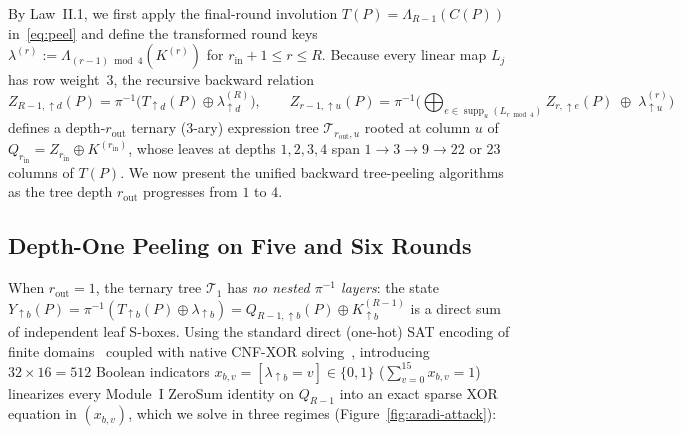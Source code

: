 \documentclass[11pt,a4paper]{article}
\theoremstyle{definition}
\theoremstyle{remark}
\newcommand{\supp}{\operatorname{supp}}
\begin{document}
By Law~II.1, we first apply the final-round involution $T(P) = \Lambda_{R-1}(C(P))$ in~\eqref{eq:peel} and define the transformed round keys $\lambda^{(r)} := \Lambda_{(r-1)\bmod 4}(K^{(r)})$ for $r_{\text{in}} + 1 \le r \le R$. Because every linear map $L_j$ has row weight~$3$, the recursive backward relation
\[
Z_{R-1,\uparrow d}(P) = \pi^{-1}\!\bigl(T_{\uparrow d}(P) \oplus \lambda^{(R)}_{\uparrow d}\bigr), \qquad
Z_{r-1,\uparrow u}(P) = \pi^{-1}\!\Biggl(\bigoplus_{e \in \supp_u(L_{r\bmod 4})} Z_{r,\uparrow e}(P) \;\oplus\; \lambda^{(r)}_{\uparrow u}\Biggr)
\]
defines a depth-$r_{\text{out}}$ ternary ($3$-ary) expression tree $\mathcal{T}_{r_{\text{out}}, u}$ rooted at column $u$ of $Q_{r_{\text{in}}} = Z_{r_{\text{in}}} \oplus K^{(r_{\text{in}})}$, whose leaves at depths $1, 2, 3, 4$ span $1 \to 3 \to 9 \to 22\text{ or }23$ columns of $T(P)$. We now present the unified backward tree-peeling algorithms as the tree depth $r_{\text{out}}$ progresses from $1$ to $4$.

\subsection{Depth-One Peeling on Five and Six Rounds}
\label{subsec:depth1}
\label{subsec:5r-6cp}
\label{subsec:5r-4cp}

When $r_{\text{out}} = 1$, the ternary tree $\mathcal{T}_1$ has \emph{no nested $\pi^{-1}$ layers}: the state $Y_{\uparrow b}(P) = \pi^{-1}(T_{\uparrow b}(P) \oplus \lambda_{\uparrow b}) = Q_{R-1,\uparrow b}(P) \oplus K^{(R-1)}_{\uparrow b}$ is a direct sum of independent leaf S-boxes. Using the standard direct (one-hot) SAT encoding of finite domains~\cite{Wal00} coupled with native CNF-XOR solving~\cite{CMS}, introducing $32 \times 16 = 512$ Boolean indicators $x_{b,v} = [\lambda_{\uparrow b} = v] \in \{0,1\}$ ($\sum_{v=0}^{15} x_{b,v} = 1$) linearizes every Module~I ZeroSum identity on $Q_{R-1}$ into an exact sparse XOR equation in $(x_{b,v})$, which we solve in three regimes (Figure~\ref{fig:aradi-attack}):
\end{document}
